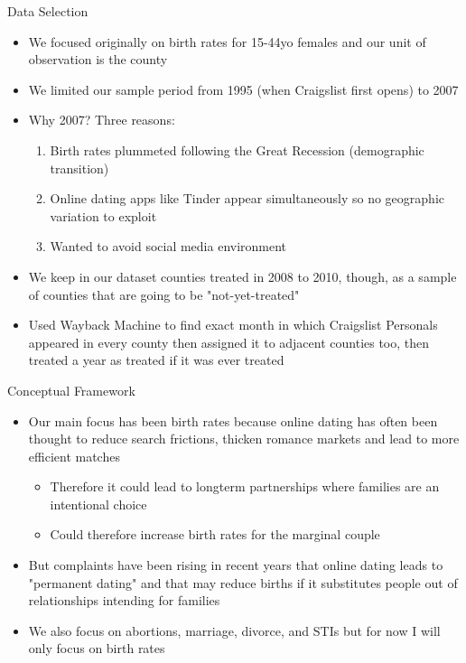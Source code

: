 \documentclass{beamer}
\begin{document}
\begin{frame}{Data Selection}

\begin{itemize}
\item We focused originally on birth rates for 15-44yo females and our unit of observation is the county
\item We limited our sample period from 1995 (when Craigslist first opens) to 2007
\item Why 2007?  Three reasons:
	\begin{enumerate}
	\item Birth rates plummeted following the Great Recession (demographic transition)
	\item Online dating apps like Tinder appear simultaneously so no geographic variation to exploit
	\item Wanted to avoid social media environment
	\end{enumerate}
\item We keep in our dataset counties treated in 2008 to 2010, though, as a sample of counties that are going to be "not-yet-treated"
\item Used Wayback Machine to find exact month in which Craigslist Personals appeared in every county then assigned it to adjacent counties too, then treated a year as treated if it was ever treated

\end{itemize}

\end{frame}


\begin{frame}{Conceptual Framework}

\begin{itemize}
\item Our main focus has been birth rates because online dating has often been thought to reduce search frictions, thicken romance markets and lead to more efficient matches
	\begin{itemize}
	\item Therefore it could lead to longterm partnerships where families are an intentional choice
	\item Could therefore increase birth rates for the marginal couple
	\end{itemize}
\item But complaints have been rising in recent years that online dating leads to "permanent dating" and that may reduce births if it substitutes people out of relationships intending for families
\item We also focus on abortions, marriage, divorce, and STIs but for now I will only focus on birth rates

\end{itemize}

\end{frame}
\end{document}
